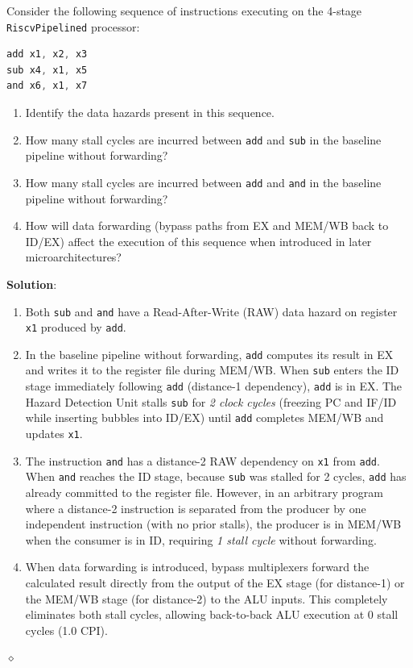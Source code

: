 \begin{problem}
Consider the following sequence of instructions executing on the 4-stage \texttt{RiscvPipelined} processor:
\begin{lstlisting}[language=c]
add x1, x2, x3
sub x4, x1, x5
and x6, x1, x7
\end{lstlisting}
\begin{enumerate}
    \item Identify the data hazards present in this sequence.
    \item How many stall cycles are incurred between \texttt{add} and \texttt{sub} in the baseline pipeline without forwarding?
    \item How many stall cycles are incurred between \texttt{add} and \texttt{and} in the baseline pipeline without forwarding?
    \item How will data forwarding (bypass paths from EX and MEM/WB back to ID/EX) affect the execution of this sequence when introduced in later microarchitectures?
\end{enumerate}

\textbf{Solution}:
\begin{enumerate}
    \item Both \texttt{sub} and \texttt{and} have a Read-After-Write (RAW) data hazard on register \texttt{x1} produced by \texttt{add}.
    \item In the baseline pipeline without forwarding, \texttt{add} computes its result in EX and writes it to the register file during MEM/WB. When \texttt{sub} enters the ID stage immediately following \texttt{add} (distance-1 dependency), \texttt{add} is in EX. The Hazard Detection Unit stalls \texttt{sub} for \textit{2 clock cycles} (freezing PC and IF/ID while inserting bubbles into ID/EX) until \texttt{add} completes MEM/WB and updates \texttt{x1}.
    \item The instruction \texttt{and} has a distance-2 RAW dependency on \texttt{x1} from \texttt{add}. When \texttt{and} reaches the ID stage, because \texttt{sub} was stalled for 2 cycles, \texttt{add} has already committed to the register file. However, in an arbitrary program where a distance-2 instruction is separated from the producer by one independent instruction (with no prior stalls), the producer is in MEM/WB when the consumer is in ID, requiring \textit{1 stall cycle} without forwarding.
    \item When data forwarding is introduced, bypass multiplexers forward the calculated result directly from the output of the EX stage (for distance-1) or the MEM/WB stage (for distance-2) to the ALU inputs. This completely eliminates both stall cycles, allowing back-to-back ALU execution at 0 stall cycles (1.0 CPI).
\end{enumerate}
$\diamond$
\end{problem}

